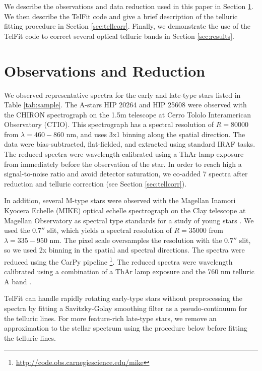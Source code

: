 We describe the observations and data reduction used in this paper in Section \ref{sec:obs}. We then describe the TelFit code and give a brief description of the telluric fitting procedure in Section \ref{sec:tellcorr}. Finally, we demonstrate the use of the TelFit code to correct several optical telluric bands in Section \ref{sec:results}. 




\section{Observations and Reduction}
\label{sec:obs}
We observed representative spectra for the early and late-type stars listed in Table \ref{tab:sample}. The A-stars HIP 20264 and HIP 25608 were observed with the CHIRON spectrograph on the 1.5m telescope at Cerro Tololo Interamerican Observatory (CTIO). This spectrograph has a spectral resolution of $R = 80000$ from $\lambda = 460 - 860$ nm, and uses 3x1 binning along the spatial direction. The data were bias-subtracted, flat-fielded, and extracted using standard IRAF tasks. The reduced spectra were wavelength-calibrated using a ThAr lamp exposure from immediately before the observation of the star. In order to reach high a signal-to-noise ratio and avoid detector saturation, we co-added 7 spectra after reduction and telluric correction (see Section \ref{sec:tellcorr}).

In addition, several M-type stars were observed with the Magellan Inamori Kyocera Echelle (MIKE) optical echelle spectrograph on the Clay telescope at Magellan Observatory as spectral type standards for a study of young stars \citep{Kraus2014}. We used the $0.7''$ slit, which yields a spectral resolution of $R = 35000$ from $\lambda = 335 - 950$ nm. The pixel scale oversamples the resolution with the $0.7''$ slit, so we used 2x binning in the spatial and spectral directions. The spectra were reduced using the CarPy pipeline \citep{Kelson2003}\footnote{\url{http://code.obs.carnegiescience.edu/mike}}. The reduced spectra were wavelength calibrated using a combination of a ThAr lamp exposure and the 760 nm telluric A band \citep[see][for details]{Kraus2014}.

TelFit can handle rapidly rotating early-type stars without preprocessing the spectra by fitting a Savitzky-Golay smoothing filter \citep{savitzky1964} as a pseudo-continuum for the telluric lines. For more feature-rich late-type stars, we remove an approximation to the stellar spectrum using the procedure below before fitting the telluric lines.

